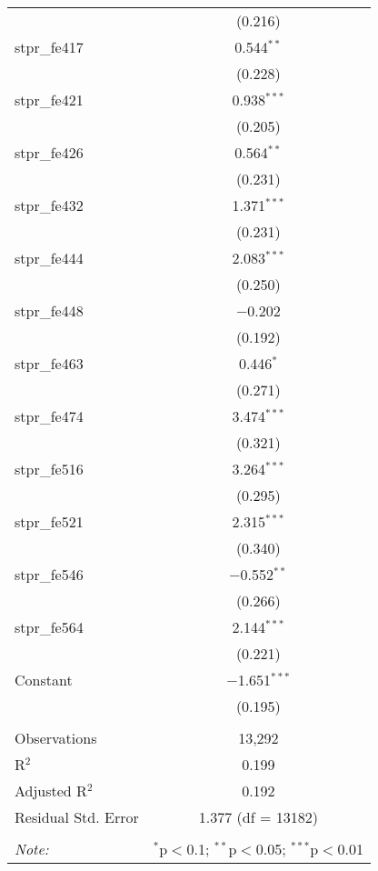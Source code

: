 \begin{table}[!htbp]
\begin{tabular}{@{\extracolsep{5pt}}lc}
  & (0.216) \\ 
  stpr\_fe417 & 0.544$^{**}$ \\ 
  & (0.228) \\ 
  stpr\_fe421 & 0.938$^{***}$ \\ 
  & (0.205) \\ 
  stpr\_fe426 & 0.564$^{**}$ \\ 
  & (0.231) \\ 
  stpr\_fe432 & 1.371$^{***}$ \\ 
  & (0.231) \\ 
  stpr\_fe444 & 2.083$^{***}$ \\ 
  & (0.250) \\ 
  stpr\_fe448 & $-$0.202 \\ 
  & (0.192) \\ 
  stpr\_fe463 & 0.446$^{*}$ \\ 
  & (0.271) \\ 
  stpr\_fe474 & 3.474$^{***}$ \\ 
  & (0.321) \\ 
  stpr\_fe516 & 3.264$^{***}$ \\ 
  & (0.295) \\ 
  stpr\_fe521 & 2.315$^{***}$ \\ 
  & (0.340) \\ 
  stpr\_fe546 & $-$0.552$^{**}$ \\ 
  & (0.266) \\ 
  stpr\_fe564 & 2.144$^{***}$ \\ 
  & (0.221) \\ 
  Constant & $-$1.651$^{***}$ \\ 
  & (0.195) \\ 
 \hline \\[-1.8ex] 
Observations & 13,292 \\ 
R$^{2}$ & 0.199 \\ 
Adjusted R$^{2}$ & 0.192 \\ 
Residual Std. Error & 1.377 (df = 13182) \\ 
\hline 
\hline \\[-1.8ex] 
\textit{Note:}  & \multicolumn{1}{r}{$^{*}$p$<$0.1; $^{**}$p$<$0.05; $^{***}$p$<$0.01} \\ 
\end{tabular} 
\end{table} 
